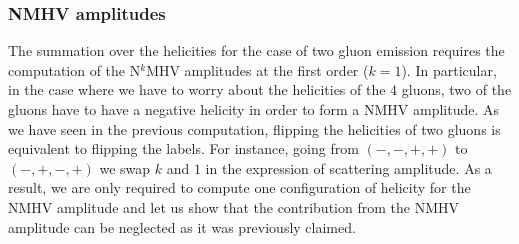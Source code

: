 \subsubsection{NMHV amplitudes}

The summation over the helicities for the case of two gluon emission requires the computation of the N$^k$MHV amplitudes at the first order ($k=1$). In particular, in the case where we have to worry about the helicities of the $4$ gluons, two of the gluons have to have a negative helicity in order to form a NMHV amplitude. As we have seen in the previous computation, flipping the helicities of two gluons is equivalent to flipping the labels. For instance, going from $(-,-,+,+)$ to $(-,+,-,+)$ we swap $k$ and $1$ in the expression of scattering amplitude. As a result, we are only required to compute one configuration of helicity for the NMHV amplitude and let us show that the contribution from the NMHV amplitude can be neglected as it was previously claimed.

